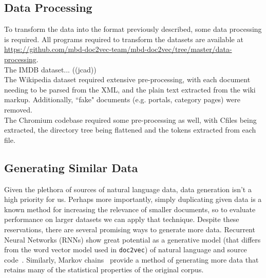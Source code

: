 \documentclass[11pt]{article}
\newcommand{\CPP}
{C\nolinebreak[4]\hspace{-.05em}\raisebox{.22ex}{\footnotesize\bf ++\ }}
\begin{document}
\subsection*{Data Processing}
  To transform the data into the format previously described, some data processing
  is required. All programs required to transform the datasets are available at
  \url{https://github.com/mbd-doc2vec-team/mbd-doc2vec/tree/master/data-processing}.\\
  The IMDB dataset... ((jcad))\\
  The Wikipedia dataset required extensive pre-processing, with each document
  needing to be parsed from the XML, and the plain text extracted from the wiki markup.
  Additionally, ``fake" documents (e.g. portals, category pages) were removed.\\
  The Chromium codebase required some pre-processing as well, with \CPP files being
  extracted, the directory tree being flattened and the tokens extracted from each file.
\subsection*{Generating Similar Data}
  Given the plethora of sources of natural language data, data generation isn't a high
  priority for us. Perhaps more importantly, simply duplicating given data is a known
  method for increasing the relevance of smaller documents, so to evaluate performance
  on larger datasets we can apply that technique. Despite these reservations, there are
  several promising ways to generate more data. Recurrent Neural Networks (RNNs) show
  great potential as a generative model (that differs from the word vector model used
  in \texttt{doc2vec}) of natural language and source code~\cite{rnn2015}. Similarly,
  Markov chains~\cite{shannon2001mathematical} provide a method of generating more data that
  retains many of the statistical properties of the original corpus.

\newpage
\printbibliography
\end{document}

